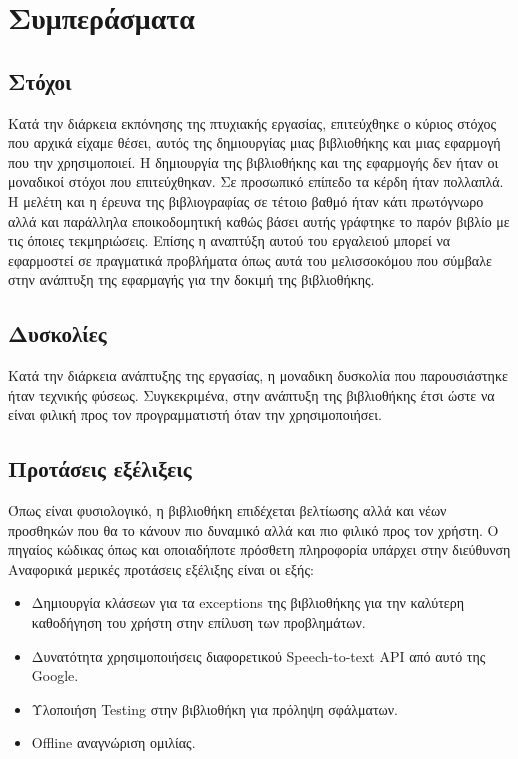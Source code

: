 \documentclass[oneside, 12pt]{book}
\begin{document}
\chapter{Συμπεράσματα}
\section{Στόχοι}
Κατά την διάρκεια εκπόνησης της πτυχιακής εργασίας, επιτεύχθηκε ο κύριος στόχος που αρχικά είχαμε θέσει, αυτός της δημιουργίας μιας βιβλιοθήκης και μιας εφαρμογή που την χρησιμοποιεί. Η δημιουργία της βιβλιοθήκης και της εφαρμογής δεν ήταν οι μοναδικοί στόχοι που επιτεύχθηκαν. Σε προσωπικό επίπεδο τα κέρδη ήταν πολλαπλά. Η μελέτη και η έρευνα της βιβλιογραφίας σε τέτοιο βαθμό ήταν κάτι πρωτόγνωρο αλλά και παράλληλα εποικοδομητική καθώς βάσει αυτής γράφτηκε το παρόν βιβλίο με τις όποιες τεκμηριώσεις. Επίσης η αναπτύξη αυτού του εργαλειού μπορεί να εφαρμοστεί σε πραγματικά προβλήματα όπως αυτά του μελισσοκόμου που σύμβαλε στην ανάπτυξη της εφαρμαγής για την δοκιμή της βιβλιοθήκης.
\section{Δυσκολίες}
Κατά την διάρκεια ανάπτυξης της εργασίας, η μοναδικη δυσκολία που παρουσιάστηκε ήταν τεχνικής φύσεως. Συγκεκριμένα, στην ανάπτυξη της βιβλιοθήκης έτσι ώστε να είναι φιλική προς τον προγραμματιστή όταν την χρησιμοποιήσει.
\section{Προτάσεις εξέλιξεις}
Όπως είναι φυσιολογικό, η βιβλιοθήκη επιδέχεται βελτίωσης αλλά και νέων προσθηκών που θα το κάνουν πιο δυναμικό αλλά και πιο φιλικό προς τον χρήστη. Ο πηγαίος κώδικας όπως και οποιαδήποτε πρόσθετη πληροφορία υπάρχει στην διεύθυνση 
Αναφορικά μερικές προτάσεις εξέλιξης είναι οι εξής:
\begin{itemize}
	\item Δημιουργία κλάσεων για τα exceptions της βιβλιοθήκης για την καλύτερη καθοδήγηση του χρήστη στην επίλυση των προβλημάτων.
	\item Δυνατότητα χρησιμοποιήσεις διαφορετικού Speech-to-text API από αυτό της Google.
	\item Υλοποιήση Testing στην βιβλιοθήκη για πρόληψη σφάλματων.
	\item Offline αναγνώριση ομιλίας.
\end{itemize}
\end{document}

